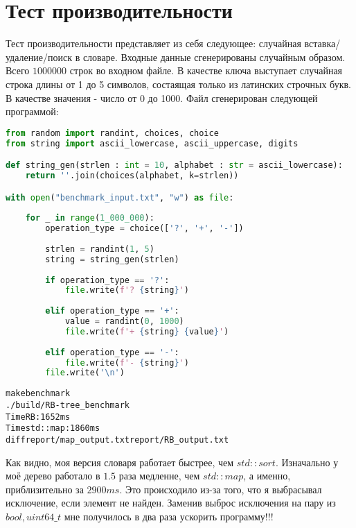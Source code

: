 \section{Тест производительности}


Тест производительности представляет из себя следующее: случайная вставка/удаление/поиск в словаре. Входные данные сгенерированы случайным образом. Всего $1000000$ строк во входном файле. В качестве ключа выступает случайная строка длины от 1 до 5 символов, состаящая только из латинских строчных букв. В качестве значения - число от 0 до 1000. Файл сгенерирован следующей программой:
\begin{lstlisting}[language=python]
from random import randint, choices, choice
from string import ascii_lowercase, ascii_uppercase, digits

def string_gen(strlen : int = 10, alphabet : str = ascii_lowercase):
    return ''.join(choices(alphabet, k=strlen))

with open("benchmark_input.txt", "w") as file:
    
    for _ in range(1_000_000):
        operation_type = choice(['?', '+', '-'])
        
        strlen = randint(1, 5)
        string = string_gen(strlen)
        
        if operation_type == '?':
            file.write(f'? {string}')
            
        elif operation_type == '+':
            value = randint(0, 1000)
            file.write(f'+ {string} {value}')
            
        elif operation_type == '-':
            file.write(f'- {string}')
        file.write('\n')
\end{lstlisting}

\begin{alltt}
make benchmark
./build/RB-tree_benchmark
Time RB: 1652 ms
Time std::map: 1860 ms
diff report/map_output.txt report/RB_output.txt
\end{alltt}

Как видно, моя версия словаря работает быстрее, чем $std::sort$. Изначально у моё дерево работало в $1.5$ раза медленне, чем $std::map$, а именно, приблизительно за $2900 ms$. Это происходило из-за того, что я выбрасывал исключение, если элемент не найден. Заменив выброс исключения на пару из $bool, uint64\_t$ мне получилось в два раза ускорить программу!!! 

\pagebreak

